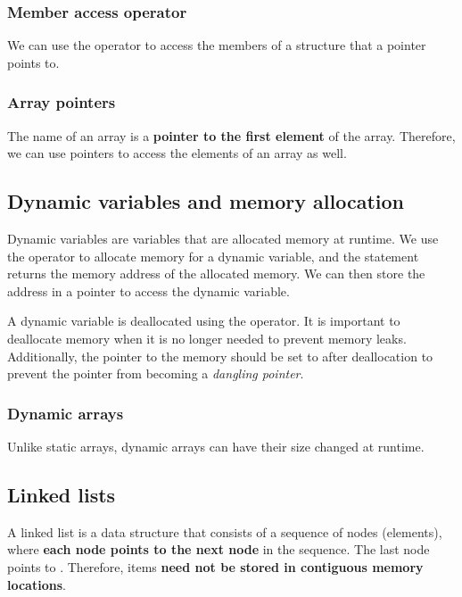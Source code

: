 \documentclass{article}
\begin{document}
\subsubsection{Member access operator}
We can use the  operator to access the members of a structure that a pointer points to.


\subsubsection{Array pointers}
The name of an array is a \textbf{pointer to the first element} of the array. Therefore, we can use pointers to access the elements of an array as well.



\subsection{Dynamic variables and memory allocation}
Dynamic variables are variables that are allocated memory at runtime. We use the  operator to allocate memory for a dynamic variable, and the statement returns the memory address of the allocated memory. We can then store the address in a pointer to access the dynamic variable.

A dynamic variable is deallocated using the  operator. It is important to deallocate memory when it is no longer needed to prevent memory leaks. Additionally, the pointer to the memory should be set to  after deallocation to prevent the pointer from becoming a \emph{dangling pointer}.


\label{sec:dynamicarrays}
\subsubsection{Dynamic arrays}
Unlike static arrays, dynamic arrays can have their size changed at runtime.


\subsection{Linked lists}
A linked list is a data structure that consists of a sequence of nodes (elements), where \textbf{each node points to the next node} in the sequence. The last node points to . Therefore, items \textbf{need not be stored in contiguous memory locations}.
\end{document}
